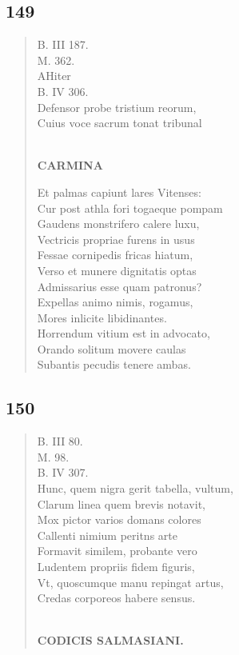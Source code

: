 \documentclass[11pt, a4paper]{report}
\begin{document}
            \subsection*{149}
      \begin{verse}
      B. III 187. \\ M. 362. \\ AHiter \\ B. IV 306. \\ Defensor probe tristium reorum, \\ Cuius voce sacrum tonat tribunal \\ 
        ﻿\pagebreak 
    \begin{center} \textbf{CARMINA} \end{center} \marginpar{[144]} Et palmas capiunt lares Vitenses: \\ Cur post athla fori togaeque pompam \\ Gaudens monstrifero calere luxu, \\ Vectricis propriae furens in usus \\ Fessae cornipedis fricas hiatum, \\ Verso et munere dignitatis optas \\ Admissarius esse quam patronus? \\ Expellas animo nimis, rogamus, \\ Mores inlicite libidinantes. \\ Horrendum vitium est in advocato, \\ Orando solitum movere caulas \\ Subantis pecudis tenere ambas. \\ 
      \end{verse}
  
            \subsection*{150}
      \begin{verse}
      B. III 80. \\ M. 98. \\ B. IV 307. \\ Hunc, quem nigra gerit tabella, vultum, \\ Clarum linea quem brevis notavit, \\ Mox pictor varios domans colores \\ Callenti nimium peritns arte \\ Formavit similem, probante vero \\ Ludentem propriis fidem figuris, \\ Vt, quoscumque manu repingat artus, \\ Credas corporeos habere sensus. \\ 
        ﻿\pagebreak 
    \begin{center} \textbf{CODICIS SALMASIANI.} \end{center} \marginpar{[145]} 
      \end{verse}
  
\end{document}
